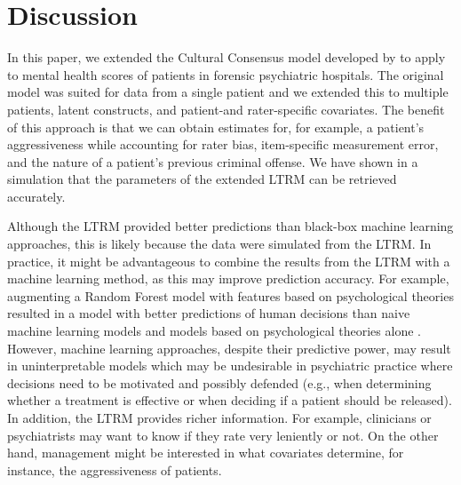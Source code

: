 \documentclass[a4paper,usenames,dvipsnames]{article}
\newenvironment{revision}{\color{black}}{\color{black}}
\newenvironment{revisionN}{\color{black}}{\color{black}}
\begin{document}
\section*{Discussion}

In this paper, we extended the Cultural Consensus model developed by  to apply to mental health scores of patients in forensic psychiatric hospitals. The original model was suited for data from a single patient and we extended this to multiple patients, latent constructs, and patient-and rater-specific covariates. The benefit of this approach is that we can obtain estimates for, for example, a \begin{revisionN}patient's\end{revisionN} aggressiveness while accounting for rater bias, item-specific measurement error, and the nature of a patient's previous criminal offense. We have shown in a simulation that the parameters of the extended LTRM can be retrieved accurately.

Although the LTRM provided better predictions than black-box machine learning approaches, this is likely because the data were simulated from the LTRM. 
\protect\begin{revision}%
In practice, it might be advantageous to combine the results from the LTRM with a machine learning method, as this may improve prediction accuracy. 
For example, augmenting a Random Forest model with features based on psychological theories resulted in a model with better predictions of human decisions than naive machine learning models and models based on psychological theories alone \cite{plonsky2019predicting, plonsky2017psychological}.%
\protect\end{revision}
However, machine learning approaches, despite their predictive power, may result in uninterpretable models which may be undesirable in psychiatric practice where decisions need to be motivated and possibly defended (e.g., when determining whether a treatment is effective or when deciding if a patient should be released). \protect\begin{revision}In addition, the LTRM provides richer information. For example, clinicians or psychiatrists may want to know if they rate very leniently or not. On the other hand, management might be interested in what covariates determine, for instance, the aggressiveness of patients.\protect\end{revision}
\end{document}
